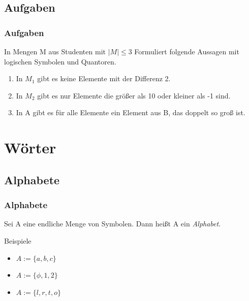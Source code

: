\documentclass{beamer}
\begin{document}
\subsection{Aufgaben}
\begin{frame}
  \frametitle{Aufgaben}
  \begin{exampleblock}{In Mengen M aus Studenten mit $|M| \leq 3$}
    Formuliert folgende Aussagen mit logischen Symbolen und Quantoren.
    \begin{enumerate}
      \item In $M_1$ gibt es keine Elemente mit der Differenz 2.
      \item In $M_2$ gibt es nur Elemente die größer als 10 oder kleiner als -1 sind.
      \item In A gibt es für alle Elemente ein Element aus B, das doppelt so groß ist.
    \end{enumerate}
  \end{exampleblock}
\end{frame}

\section{Wörter}
\subsection{Alphabete}
\begin{frame}
  \frametitle{Alphabete}
  \begin{definition}
    Sei A eine endliche Menge von Symbolen. Dann heißt A ein \emph{Alphabet}.
  \end{definition}
  \begin{exampleblock}{Beispiele}
    \begin{itemize}
      \item $A := \{a, b, c\}$
      \item $A := \{\phi, 1, 2\}$
      \item $A := \{l, r, t, o\}$
    \end{itemize}
  \end{exampleblock}
\end{frame}
\end{document}

